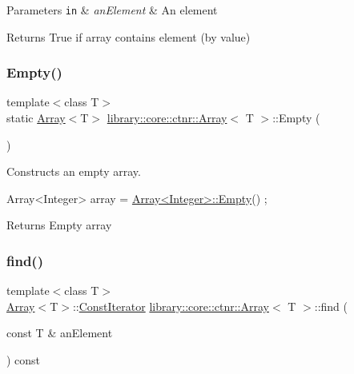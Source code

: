 \begin{DoxyParams}[1]{Parameters}
\mbox{\tt in}  & {\em an\+Element} & An element \\
\hline
\end{DoxyParams}
\begin{DoxyReturn}{Returns}
True if array contains element (by value) 
\end{DoxyReturn}
\mbox{\label{classlibrary_1_1core_1_1ctnr_1_1Array_a7795ee997ae6008cd0bc8db607315524}} 
\subsubsection{\texorpdfstring{Empty()}{Empty()}}
{\footnotesize\ttfamily template$<$class T$>$ \\
static \hyperlink{classlibrary_1_1core_1_1ctnr_1_1Array}{Array}$<$T$>$ \hyperlink{classlibrary_1_1core_1_1ctnr_1_1Array}{library\+::core\+::ctnr\+::\+Array}$<$ T $>$\+::Empty (\begin{DoxyParamCaption}{ }\end{DoxyParamCaption})\hspace{0.3cm}{\ttfamily [static]}}



Constructs an empty array. 


\begin{DoxyCode}
Array<Integer> array = \hyperlink{classlibrary_1_1core_1_1ctnr_1_1Array_a7795ee997ae6008cd0bc8db607315524}{Array<Integer>::Empty}() ;
\end{DoxyCode}


\begin{DoxyReturn}{Returns}
Empty array 
\end{DoxyReturn}
\mbox{\label{classlibrary_1_1core_1_1ctnr_1_1Array_aeb8ed38b67b6031e27c188d89bd5cbbf}} 
\subsubsection{\texorpdfstring{find()}{find()}\hspace{0.1cm}{\footnotesize\ttfamily [1/2]}}
{\footnotesize\ttfamily template$<$class T$>$ \\
\hyperlink{classlibrary_1_1core_1_1ctnr_1_1Array}{Array}$<$T$>$\+::\hyperlink{classlibrary_1_1core_1_1ctnr_1_1Array_ac26454f2a2ad4013873386a70aa25fc4}{Const\+Iterator} \hyperlink{classlibrary_1_1core_1_1ctnr_1_1Array}{library\+::core\+::ctnr\+::\+Array}$<$ T $>$\+::find (\begin{DoxyParamCaption}\item[{const T \&}]{an\+Element }\end{DoxyParamCaption}) const}



